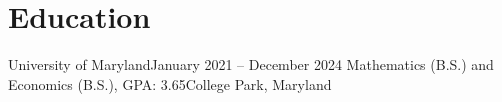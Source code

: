\section{Education}
\resumeSubHeadingListStart
\resumeSubheading
{University of Maryland}{January 2021 -- December 2024}
{Mathematics (B.S.) and Economics (B.S.), GPA: 3.65}{College Park, Maryland}
\resumeSubHeadingListEnd
